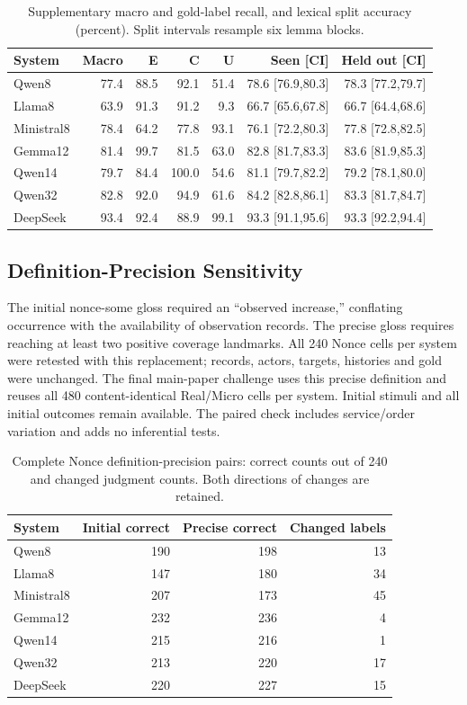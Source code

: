 \documentclass[acmlarge,anonymous,review,nonacm]{acmart}
\begin{document}
\begin{table}[H]
\centering
\small
\caption{Supplementary macro and gold-label recall, and lexical split accuracy (percent). Split intervals resample six lemma blocks.}
\label{tab:splits}
\setlength{\tabcolsep}{4pt}
\begin{tabular}{lrrrrrr}
\toprule
System & Macro & E & C & U & Seen [CI] & Held out [CI] \\
\midrule
Qwen8 & 77.4 & 88.5 & 92.1 & 51.4 & 78.6 [76.9,80.3] & 78.3 [77.2,79.7] \\
Llama8 & 63.9 & 91.3 & 91.2 & 9.3 & 66.7 [65.6,67.8] & 66.7 [64.4,68.6] \\
Ministral8 & 78.4 & 64.2 & 77.8 & 93.1 & 76.1 [72.2,80.3] & 77.8 [72.8,82.5] \\
Gemma12 & 81.4 & 99.7 & 81.5 & 63.0 & 82.8 [81.7,83.3] & 83.6 [81.9,85.3] \\
Qwen14 & 79.7 & 84.4 & 100.0 & 54.6 & 81.1 [79.7,82.2] & 79.2 [78.1,80.0] \\
Qwen32 & 82.8 & 92.0 & 94.9 & 61.6 & 84.2 [82.8,86.1] & 83.3 [81.7,84.7] \\
DeepSeek & 93.4 & 92.4 & 88.9 & 99.1 & 93.3 [91.1,95.6] & 93.3 [92.2,94.4] \\
\bottomrule
\end{tabular}
\end{table}
\subsection{Definition-Precision Sensitivity}
The initial nonce-some gloss required an ``observed increase,'' conflating occurrence with the availability of observation records. The precise gloss requires reaching at least two positive coverage landmarks. All 240 Nonce cells per system were retested with this replacement; records, actors, targets, histories and gold were unchanged. The final main-paper challenge uses this precise definition and reuses all 480 content-identical Real/Micro cells per system. Initial stimuli and all initial outcomes remain available. The paired check includes service/order variation and adds no inferential tests.

\begin{table}[H]
\centering
\small
\caption{Complete Nonce definition-precision pairs: correct counts out of 240 and changed judgment counts. Both directions of changes are retained.}
\label{tab:precision}
\setlength{\tabcolsep}{4pt}
\begin{tabular}{lrrr}
\toprule
System & Initial correct & Precise correct & Changed labels \\
\midrule
Qwen8 & 190 & 198 & 13 \\
Llama8 & 147 & 180 & 34 \\
Ministral8 & 207 & 173 & 45 \\
Gemma12 & 232 & 236 & 4 \\
Qwen14 & 215 & 216 & 1 \\
Qwen32 & 213 & 220 & 17 \\
DeepSeek & 220 & 227 & 15 \\
\bottomrule
\end{tabular}
\end{table}
\end{document}
